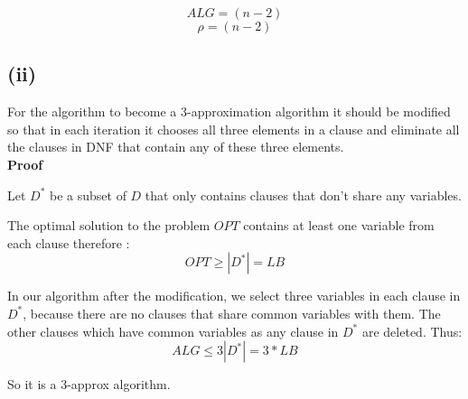 $$ ALG = (n-2) $$ 
$$ \rho = (n-2)  $$

\subsection*{(ii)}
For the algorithm to become a 3-approximation algorithm it should be modified so that in each iteration it chooses all three elements in a clause and eliminate all the clauses in DNF that contain any of these three elements.\\

\textbf{Proof}

Let $ D^* $ be a subset of $ D $ that only contains clauses that don't share any variables.

The optimal solution to the problem $ OPT $ contains at least one variable from each clause therefore :
$$ OPT \ge |D^*| = LB $$ 

In our algorithm after the modification, we select three variables in each clause in $ D^* $,
because there are no clauses that share common variables with them.
The other clauses which have common variables as any clause in $ D^* $ are deleted.
Thus:
$$ ALG \le 3 |D^*| = 3 * LB $$

So it is a 3-approx algorithm.
